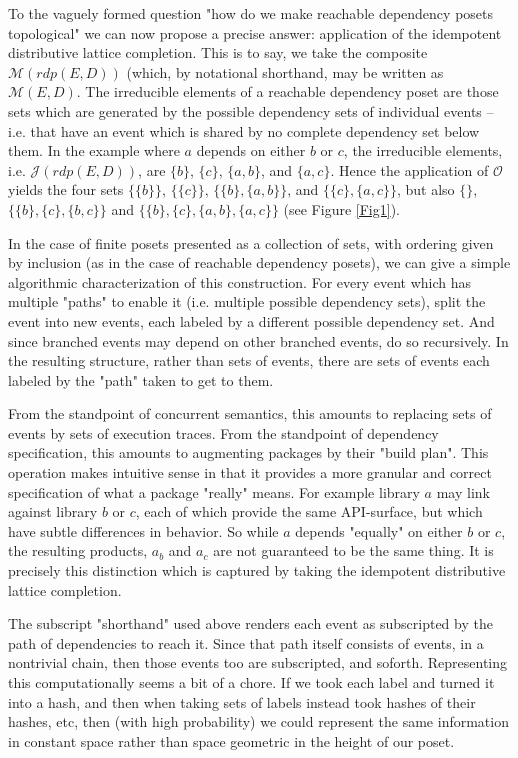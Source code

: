 \documentclass[hoptionsi,review,format=acmsmall]{acmart}
\theoremstyle{definition}
\newcommand{\Mcc}{\mathcal{M}}
\newcommand{\Oc}{\mathcal{O}}
\newcommand{\Jc}{\mathcal{J}}
\begin{document}
To the vaguely formed question "how do we make reachable dependency posets topological" we can now propose a precise answer: application of the idempotent distributive lattice completion. This is to say, we take the composite \(\Mcc(rdp(E,D))\) (which, by notational shorthand, may be written as \(\Mcc(E,D)\). The irreducible elements of a reachable dependency poset are those sets which are generated by the possible dependency sets of individual events -- i.e. that have an event which is shared by no complete dependency set below them. In the example where \(a\) depends on either \(b\) or \(c\), the irreducible elements, i.e. \(\Jc(rdp(E,D))\), are \(\{b\}\), \(\{c\}\), \(\{a,b\}\), and \(\{a,c\}\). Hence the application of \(\Oc\) yields the four sets \(\{\{b\}\}\), \(\{\{c\}\}\), \(\{\{b\},\{a,b\}\}\), and \(\{\{c\},\{a,c\}\}\), but also \(\{\}\), \(\{\{b\},\{c\},\{b,c\}\}\) and \(\{\{b\},\{c\},\{a,b\},\{a,c\}\}\) (see Figure \ref{Fig1}).

In the case of finite posets presented as a collection of sets, with ordering given by inclusion (as in the case of reachable dependency posets), we can give a simple algorithmic characterization of this construction. For every event which has multiple "paths" to enable it (i.e. multiple possible dependency sets), split the event into new events, each labeled by a different possible dependency set. And since branched events may depend on other branched events, do so recursively. In the resulting structure, rather than sets of events, there are sets of events each labeled by the "path" taken to get to them. 

From the standpoint of concurrent semantics, this amounts to replacing sets of events by sets of execution traces. From the standpoint of dependency specification, this amounts to augmenting packages by their "build plan". This operation makes intuitive sense in that it provides a more granular and correct specification of what a package "really" means. For example library \(a\) may link against library \(b\) or \(c\), each of which provide the same API-surface, but which have subtle differences in behavior. So while \(a\) depends "equally" on either \(b\) or \(c\), the resulting products, \(a_b\) and \(a_c\) are not guaranteed to be the same thing. It is precisely this distinction which is captured by taking the idempotent distributive lattice completion.

The subscript "shorthand" used above renders each event as subscripted by the path of dependencies to reach it. Since that path itself consists of events, in a nontrivial chain, then those events too are subscripted, and soforth. Representing this computationally seems a bit of a chore. If we took each label and turned it into a hash, and then when taking sets of labels instead took hashes of their hashes, etc, then (with high probability) we could represent the same information in constant space rather than space geometric in the height of our poset.
\end{document}
